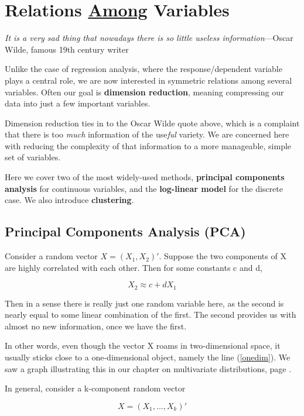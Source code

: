 \chapter{Relations \underline{Among} Variables}
\label{chap:among} 

{\it It is a very sad thing that nowadays there is so little useless
information}---Oscar Wilde, famous 19th century writer

Unlike the case of regression analysis, where the response/dependent
variable plays a central role, we are now interested in symmetric
relations among several variables.  Often our goal is {\bf dimension
reduction}, meaning compressing our data into just a few important
variables.

Dimension reduction ties in to the Oscar Wilde quote above, which is a
complaint that there is too {\it much} information of the use{\it ful}
variety.  We are concerned here with reducing the complexity of that
information to a more manageable, simple set of variables.

Here we cover two of the most widely-used methods, {\bf principal
components analysis} for continuous variables, and the {\bf log-linear
model} for the discrete case.  We also introduce {\bf clustering}.

\section{Principal Components Analysis (PCA)}
\label{pca}

Consider a random vector $X = (X_1,X_2)'$.  Suppose the two
components of X are highly correlated with each other.  
Then for some constants c and d,

\begin{equation}
\label{onedim}
X_2 \approx c + d X_1
\end{equation}

Then in a sense there is really just one random variable here, as the
second is nearly equal to some linear combination of the first.  The
second provides us with almost no new information, once we have the
first.

In other words, even though the vector X roams in two-dimensional space,
it usually sticks close to a one-dimensional object, namely the line
(\ref{onedim}).  We saw a graph illustrating this in our chapter on
multivariate distributions, page \pageref{rho2}.

In general, consider a k-component random vector 

\begin{equation}
X = (X_1,...,X_k)'
\end{equation}

